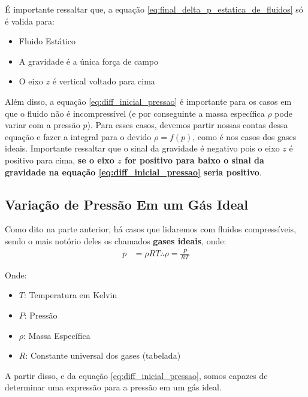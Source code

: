 \documentclass{article}
\begin{document}
            É importante ressaltar que, a equação \ref{eq:final_delta_p_estatica_de_fluidos} só é valida para:
            \begin{itemize}
                \item Fluido Estático
                \item A gravidade é a única força de campo
                \item O eixo $z$ é vertical voltado para cima
            \end{itemize}

            Além disso, a equação \ref{eq:diff_inicial_pressao} é importante para os casos em que o fluido não é incompressível (e por conseguinte a massa específica $\rho$ pode variar com a pressão
            $p$). Para esses casos, devemos partir nossas contas dessa equação e fazer a integral para o devido $\rho = f(p)$, como é nos casos dos gases ideais. Importante ressaltar que o sinal da
            gravidade é negativo pois o eixo $z$ é positivo para cima, \textbf{se o eixo $z$ for positivo para baixo o sinal da gravidade na equação \ref{eq:diff_inicial_pressao} seria positivo}.


        \subsection{Variação de Pressão Em um Gás Ideal}
            Como dito na parte anterior, há casos que lidaremos com fluidos compressíveis, sendo o mais notório deles os chamados \textbf{gases ideais}, onde:
            \begin{align}
                p &= \rho RT \therefore \rho = \frac{P}{RT} \label{eq:gases_ideais}
            \end{align}

            Onde: 
            \begin{itemize}
                \item $T$: Temperatura em Kelvin
                \item $P$: Pressão
                \item $\rho$: Massa Específica
                \item $R$: Constante universal dos gases (tabelada)
            \end{itemize}

            A partir disso, e da equação \ref{eq:diff_inicial_pressao}, somos capazes de determinar uma expressão para a pressão em um gás ideal.

        \newpage
            


    
\end{document}
